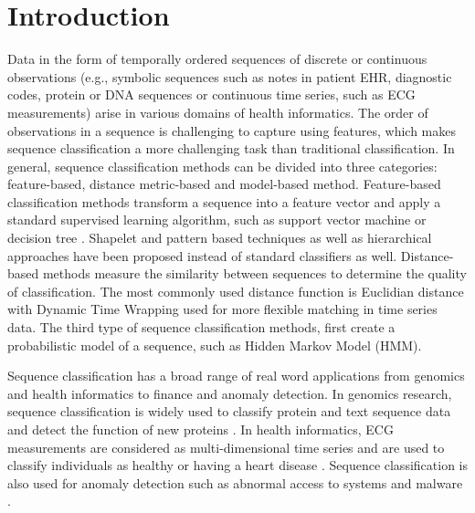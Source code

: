 \documentclass{amia_summit_2018}
\begin{document}
\section*{Introduction}
Data in the form of temporally ordered sequences of discrete or continuous observations (e.g., symbolic sequences such as notes in patient EHR, diagnostic codes, protein or DNA sequences or continuous time series, such as ECG measurements) arise in various domains of health informatics. The order of observations in a sequence is challenging to capture using features, which makes sequence classification a more challenging task than traditional classification. In general, sequence classification methods can be divided into three  categories: feature-based, distance metric-based and model-based method. Feature-based classification methods transform a sequence into a feature vector and apply a standard supervised learning algorithm, such as support vector machine \cite{leslie2004fast} or decision tree \cite{chuzhanova1998feature}. Shapelet \cite{ye2009time} and pattern \cite{kudenko1998feature, lesh1999mining} based techniques as well as hierarchical approaches \cite{nallam2016effective} have been proposed instead of standard classifiers as well. Distance-based methods measure the similarity between sequences to determine the quality of classification. The most commonly used distance function is Euclidian distance \cite{keogh2003need} with Dynamic Time Wrapping \cite{keogh2000scaling} used for more flexible matching in time series data. The third type of sequence classification methods, first create a probabilistic model of a sequence, such as Hidden Markov Model \cite{rabiner1989tutorial} (HMM).

Sequence classification has a broad range of real word applications from genomics and health informatics to finance and anomaly detection. In genomics research, sequence classification is widely used to classify protein and text sequence data \cite{yakhnenko2005discriminatively} and detect the function of new proteins \cite{deshpande2002evaluation}. In health informatics, ECG measurements are considered as multi-dimensional time series and are used to classify individuals as healthy or having a heart disease \cite{wei2006semi}. Sequence classification is also used for anomaly detection such as abnormal access to systems \cite{lane1999temporal} and malware \cite{drew2017polymorphic}.    
\end{document}
